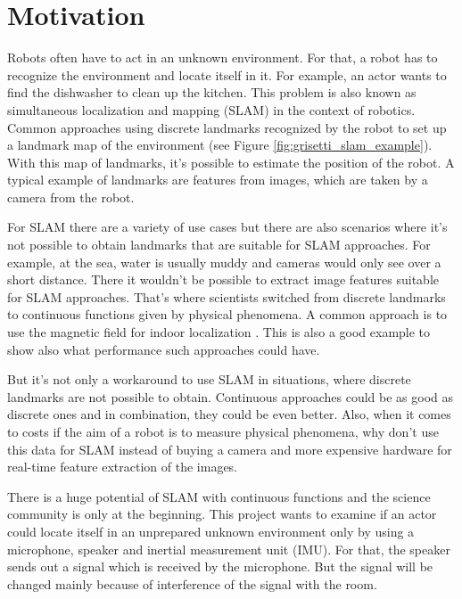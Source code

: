 \section{Motivation}

Robots often have to act in an unknown environment. For that, a robot has to recognize the environment and locate itself in it. For example, an actor wants to find the dishwasher to clean up the kitchen. This problem is also known as simultaneous localization and mapping (SLAM) in the context of robotics. Common approaches using discrete landmarks recognized by the robot to set up a landmark map of the environment (see Figure \ref{fig:grisetti_slam_example}). With this map of landmarks, it's possible to estimate the position of the robot. A typical example of landmarks are features from images, which are taken by a camera from the robot.

For SLAM there are a variety of use cases but there are also scenarios where it's not possible to obtain landmarks that are suitable for SLAM approaches. For example, at the sea, water is usually muddy and cameras would only see over a short distance. There it wouldn't be possible to extract image features suitable for SLAM approaches. That's where scientists switched from discrete landmarks to continuous functions given by physical phenomena. A common approach is to use the magnetic field for indoor localization \cite{kok_scalable_2018}. This is also a good example to show also what performance such approaches could have.

But it's not only a workaround to use SLAM in situations, where discrete landmarks are not possible to obtain. Continuous approaches could be as good as discrete ones and in combination, they could be even better. Also, when it comes to costs if the aim of a robot is to measure physical phenomena, why don't use this data for SLAM instead of buying a camera and more expensive hardware for real-time feature extraction of the images.

There is a huge potential of SLAM with continuous functions and the science community is only at the beginning. This project wants to examine if an actor could locate itself in an unprepared unknown environment only by using a microphone, speaker and inertial measurement unit (IMU). For that, the speaker sends out a signal which is received by the microphone. But the signal will be changed mainly because of interference of the signal with the room. 

